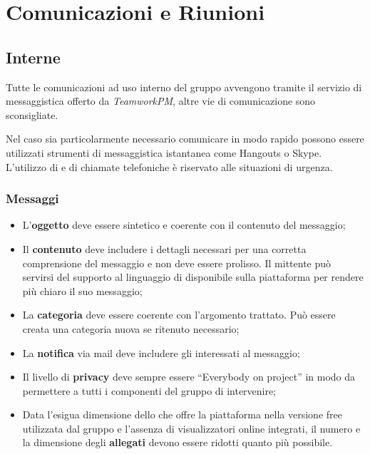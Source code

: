 \section{Comunicazioni e Riunioni}

\subsection{Interne}
\label{Comunicazioniinterne}

Tutte le comunicazioni ad uso interno del gruppo avvengono tramite il servizio di messaggistica offerto da \emph{TeamworkPM}, altre vie di comunicazione sono sconsigliate.

Nel caso sia particolarmente necessario comunicare in modo rapido possono essere utilizzati strumenti di messaggistica istantanea come Hangouts o Skype. L'utilizzo di  e di chiamate telefoniche è riservato alle situazioni di urgenza.

\subsubsection{Messaggi}
\label{Comunicazioniinternemessaggi}

\begin{itemize}
\item L'\textbf{oggetto} deve essere sintetico e coerente con il contenuto del messaggio;
\item Il \textbf{contenuto} deve includere i dettagli necessari per una corretta comprensione del messaggio e non deve essere prolisso. Il mittente può servirsi del supporto al linguaggio di  disponibile sulla piattaforma per rendere più chiaro il suo messaggio;
\item La \textbf{categoria} deve essere coerente con l'argomento trattato. Può essere creata una categoria nuova se ritenuto necessario;
\item La \textbf{notifica} via mail deve includere gli interessati al messaggio;
\item Il livello di \textbf{privacy} deve sempre essere ``Everybody on project'' in modo da permettere a tutti i componenti del gruppo di intervenire;
\item Data l'esigua dimensione dello  che offre la piattaforma nella versione free utilizzata dal gruppo e l'assenza di visualizzatori online integrati, il numero e la dimensione degli \textbf{allegati} devono essere ridotti quanto più possibile.
\end{itemize}


